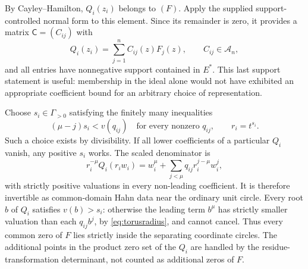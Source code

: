 \documentclass[11pt,letterpaper]{article}
\theoremstyle{definition}
\theoremstyle{remark}
\newcommand{\Acal}{\mathscr A}
\numberwithin{equation}{section}
\begin{document}
By Cayley--Hamilton, $Q_i(z_i)$ belongs to $(F)$. Apply the supplied support-controlled normal form to this element. Since its remainder is zero, it provides a matrix $\mathsf C=(C_{ij})$ with
\begin{equation}\label{eq:matrixC}
Q_i(z_i)=\sum_{j=1}^n C_{ij}(z)F_j(z),\qquad
C_{ij}\in\Acal_n,
\end{equation}
and all entries have nonnegative support contained in $E^*$. This last support statement is useful: membership in the ideal alone would not have exhibited an appropriate coefficient bound for an arbitrary choice of representation.

Choose $s_i\in\Gamma_{>0}$ satisfying the finitely many inequalities
\begin{equation}\label{eq:torusradius}
(\mu-j)s_i<v(q_{ij})\quad
\text{for every nonzero }q_{ij},\qquad r_i=t^{s_i}.
\end{equation}
Such a choice exists by divisibility. If all lower coefficients of a particular $Q_i$ vanish, any positive $s_i$ works. The scaled denominator is
\[
r_i^{-\mu}Q_i(r_iw_i)
=w_i^\mu+\sum_{j<\mu}q_{ij}r_i^{j-\mu}w_i^j,
\]
with strictly positive valuations in every non-leading coefficient. It is therefore invertible as common-domain Hahn data near the ordinary unit circle.
Every root $b$ of $Q_i$ satisfies $v(b)>s_i$: otherwise the leading term $b^\mu$ has strictly smaller valuation than each $q_{ij}b^j$, by \eqref{eq:torusradius}, and cannot cancel. Thus every common zero of $F$ lies strictly inside the separating coordinate circles. The additional points in the product zero set of the $Q_i$ are handled by the residue-transformation determinant, not counted as additional zeros of $F$.
\end{document}
